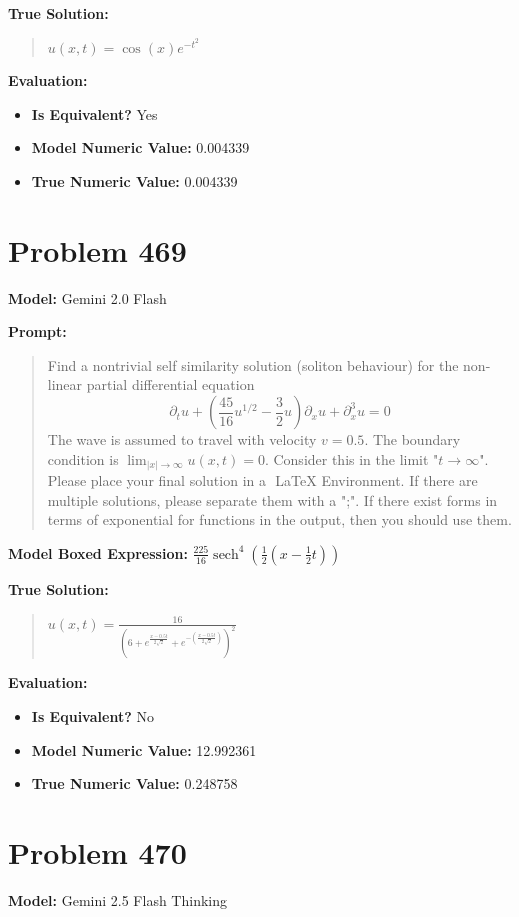 \documentclass{article}
\begin{document}
\textbf{True Solution:}
\begin{quote}
$u(x,t) = \cos(x) e^{-t^2}$
\end{quote}

\textbf{Evaluation:}
\begin{itemize}
\item \textbf{Is Equivalent?} Yes
\item \textbf{Model Numeric Value:} 0.004339
\item \textbf{True Numeric Value:} 0.004339
\end{itemize}
\vspace{1cm}
\section*{Problem 469}
\textbf{Model:} Gemini 2.0 Flash

\textbf{Prompt:}
\begin{quote}
Find a nontrivial self similarity solution (soliton behaviour) for the non-linear partial differential equation $$ \partial_t u + \left(\frac{45}{16} u^{1/2} - \frac{3}{2} u\right)\partial_x u + \partial_x^3 u=0 $$ The wave is assumed to travel with velocity $v=0.5$. The boundary condition is $\lim_{|x|\to\infty} u(x,t)=0$. Consider this in the limit "$t\rightarrow\infty$". Please place your final solution in a $\boxed{}$ LaTeX Environment. If there are multiple solutions, please separate them with a ";". If there exist forms in terms of exponential for functions in the output, then you should use them.
\end{quote}
\textbf{Model Boxed Expression:} $\frac{225}{16} \operatorname{sech}^4\left(\frac{1}{2}(x-\frac{1}{2}t)\right)$

\textbf{True Solution:}
\begin{quote}
$u(x,t) = \frac{16}{\left(6 + e^{\frac{x-0.5t}{2\sqrt{2}}} + e^{-\left(\frac{x-0.5t}{2\sqrt{2}}\right)}\right)^2}$
\end{quote}

\textbf{Evaluation:}
\begin{itemize}
\item \textbf{Is Equivalent?} No
\item \textbf{Model Numeric Value:} 12.992361
\item \textbf{True Numeric Value:} 0.248758
\end{itemize}
\vspace{1cm}
\section*{Problem 470}
\textbf{Model:} Gemini 2.5 Flash Thinking
\end{document}
